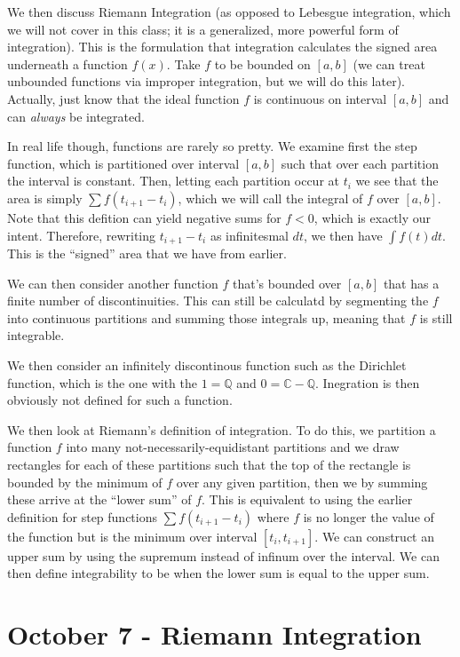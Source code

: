 \documentclass{report}
\begin{document}
We then discuss Riemann Integration (as opposed to Lebesgue integration, which we will not cover in this class; it is a generalized, more powerful form of integration). This is the formulation that integration calculates the signed area underneath a function $f(x)$. Take $f$ to be bounded on $[a, b]$ (we can treat unbounded functions via improper integration, but we will do this later). Actually, just know that the ideal function $f$ is continuous on interval $[a,b]$ and can \emph{always} be integrated. 

In real life though, functions are rarely so pretty. We examine first the step function, which is partitioned over interval $[a, b]$ such that over each partition the interval is constant. Then, letting each partition occur at $t_i$ we see that the area is simply $\sum{f(t_{i+1}-t_i)}$, which we will call the integral of $f$ over $[a,b]$. Note that this defition can yield negative sums for $f < 0$, which is exactly our intent. Therefore, rewriting $t_{i+1} - t_i$ as infinitesmal $dt$, we then have $\int{f(t) dt}$. This is the ``signed'' area that we have from earlier.

We can then consider another function $f$ that's bounded over $[a,b]$ that has a finite number of discontinuities. This can still be calculatd by segmenting the $f$ into continuous partitions and summing those integrals up, meaning that $f$ is still integrable.

We then consider an infinitely discontinous function such as the Dirichlet function, which is the one with the $1 = \mathbb{Q}$ and $0 = \mathbb{C} - \mathbb{Q}$. Inegration is then obviously not defined for such a function.

We then look at Riemann's definition of integration. To do this, we partition a function $f$ into many not-necessarily-equidistant partitions and we draw rectangles for each of these partitions such that the top of the rectangle is bounded by the minimum of $f$ over any given partition, then we by summing these arrive at the ``lower sum'' of $f$. This is equivalent to using the earlier definition for step functions $\sum{f(t_{i+1}-t_i)}$ where $f$ is no longer the value of the function but is the minimum over interval $[t_i, t_{i+1}]$. We can construct an upper sum by using the supremum instead of infinum over the interval. We can then define integrability to be when the lower sum is equal to the upper sum.

\chapter{October 7 - Riemann Integration}
\end{document}
